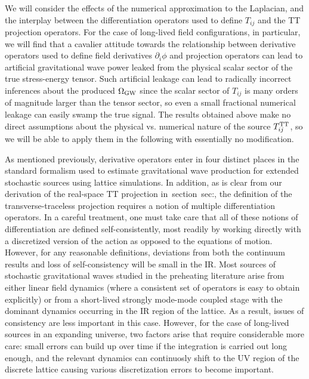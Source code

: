 \documentclass{revtex4}
\newcommand{\secref}[1]{section~#1}
\begin{document}
We will consider the effects of the numerical approximation to the Laplacian, and the interplay between the differentiation operators used to define $T_{ij}$ and the TT projection operators.
For the case of long-lived field configurations, in particular, we will find that a cavalier attitude towards the relationship between derivative operators used to define field derivatives $\partial_i\phi$ and projection operators can lead to artificial gravitational wave power leaked from the physical scalar sector of the true stress-energy tensor.
Such artificial leakage can lead to radically incorrect inferences about the produced $\Omega_{\rm GW}$ since the scalar sector of $T_{ij}$ is many orders of magnitude larger than the tensor sector, so even a small fractional numerical leakage can easily swamp the true signal.
The results obtained above make no direct assumptions about the physical vs. numerical nature of the source $T_{ij}^{{\rm TT}}$, so we will be able to apply them in the following with essentially no modification.


As mentioned previously, derivative operators enter in four distinct places in the standard formalism used to estimate gravitational wave production for extended stochastic sources using lattice simulations.
In addition, as is clear from our derivation of the real-space TT projection in~\secref{sec:}, the definition of the transverse-traceless projection requires a notion of multiple differentiation operators.
In a careful treatment, one must take care that all of these notions of differentiation are defined self-consistently, most readily by working directly with a discretized version of the action as opposed to the equations of motion.
However, for any reasonable definitions, deviations from both the continuum results and loss of self-consistency will be small in the IR.
Most sources of stochastic gravitational waves studied in the preheating literature arise from either linear field dynamics (where a consistent set of operators is easy to obtain explicitly) or from a short-lived strongly mode-mode coupled stage with the dominant dynamics occurring in the IR region of the lattice.
As a result, issues of consistency are less important in this case.
However, for the case of long-lived sources in an expanding universe, two factors arise that require considerable more care: small errors can build up over time if the integration is carried out long enough, and the relevant dynamics can continuosly shift to the UV region of the discrete lattice causing various discretization errors to become important.
\end{document}
